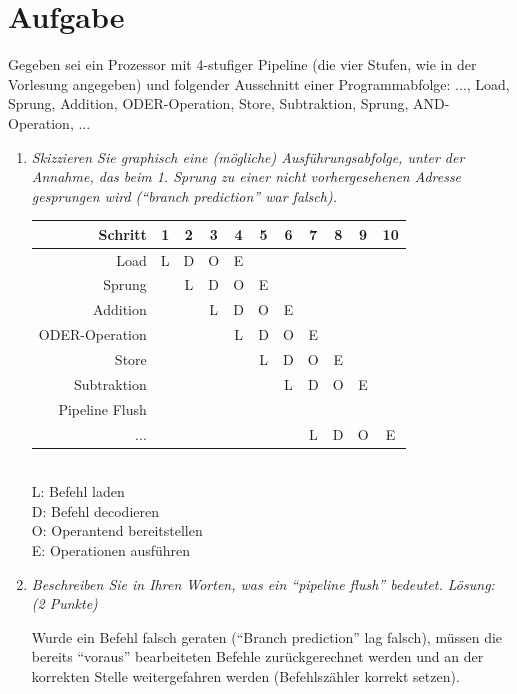\documentclass[10pt]{article}
\begin{document}
\section{Aufgabe}
Gegeben sei ein Prozessor mit 4-stufiger Pipeline (die vier Stufen, wie in der Vorlesung angegeben) und folgender Ausschnitt einer Programmabfolge: 
..., Load, Sprung, Addition, ODER-Operation, Store, Subtraktion, Sprung, AND-Operation, ...
\begin{enumerate}[label=\alph*)]
	\item 
	\textit{Skizzieren Sie graphisch eine (mögliche) Ausführungsabfolge, unter der Annahme, das beim 1. Sprung zu einer nicht vorhergesehenen Adresse gesprungen wird ("`branch prediction"' war falsch).}
	
	\begin{tabular}{r | c | c | c | c | c | c | c | c | c | c}
	Schritt & 1 & 2 & 3 & 4 & 5 & 6 & 7 & 8 & 9 & 10\\
	\hline
	Load		&	L	&	D	&	O	&	E	\\
	Sprung		&	&	L	&	D	&	O	& 	E 	\\
	Addition	&	&	&	L	&	D	&	O	&	E	\\
	ODER-Operation	&	&	&	&	L	&	D	&	O	&	E	\\
	Store	&	&	&	&	&	L	&	D	&	O	&	E	\\
	Subtraktion	&	&	&	&	& &	L	&	D	&	O	&	E	\\
	Pipeline Flush &	&	&	&	&	&	&	&	&  & \\
	...		&  &	&	&	&	&	&	L	&	D	&	O	&	E	\\
	\end{tabular}\\
	L: Befehl laden\\
	D: Befehl decodieren\\
	O: Operantend bereitstellen\\
	E: Operationen ausführen\\
	\item 
	\textit{Beschreiben Sie in Ihren Worten, was ein "`pipeline flush"' bedeutet. Lösung: (2 Punkte) }
	
	Wurde ein Befehl falsch geraten ("`Branch prediction"' lag falsch), müssen die bereits "`voraus"' bearbeiteten Befehle zurückgerechnet werden und an der korrekten Stelle weitergefahren werden (Befehlszähler korrekt setzen).
	
\end{enumerate}
\newpage

\end{document}
